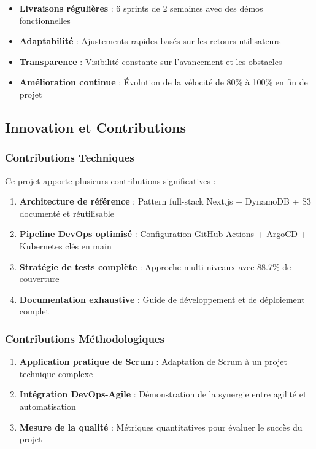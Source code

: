 \begin{itemize}
    \item \textbf{Livraisons régulières} : 6 sprints de 2 semaines avec des démos fonctionnelles
    \item \textbf{Adaptabilité} : Ajustements rapides basés sur les retours utilisateurs
    \item \textbf{Transparence} : Visibilité constante sur l'avancement et les obstacles
    \item \textbf{Amélioration continue} : Évolution de la vélocité de 80\% à 100\% en fin de projet
\end{itemize}

\subsection{Innovation et Contributions}

\subsubsection{Contributions Techniques}

Ce projet apporte plusieurs contributions significatives :

\begin{enumerate}
    \item \textbf{Architecture de référence} : Pattern full-stack Next.js + DynamoDB + S3 documenté et réutilisable
    \item \textbf{Pipeline DevOps optimisé} : Configuration GitHub Actions + ArgoCD + Kubernetes clés en main
    \item \textbf{Stratégie de tests complète} : Approche multi-niveaux avec 88.7\% de couverture
    \item \textbf{Documentation exhaustive} : Guide de développement et de déploiement complet
\end{enumerate}

\subsubsection{Contributions Méthodologiques}

\begin{enumerate}
    \item \textbf{Application pratique de Scrum} : Adaptation de Scrum à un projet technique complexe
    \item \textbf{Intégration DevOps-Agile} : Démonstration de la synergie entre agilité et automatisation
    \item \textbf{Mesure de la qualité} : Métriques quantitatives pour évaluer le succès du projet
\end{enumerate}

